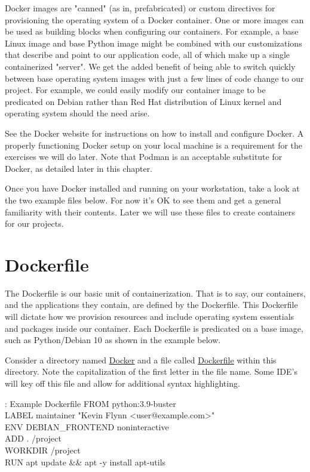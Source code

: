 \justify
Docker images are "canned" (as in, prefabricated) or custom directives
for provisioning the operating system of a Docker container. One or more
images can be used as building blocks when configuring our containers.
For example, a base Linux image and base Python image might be combined
with our customizations that describe and point to our application code,
all of which make up a single containerized "server". We get the added
benefit of being able to switch quickly between base operating system
images with just a few lines of code change to our project. For example,
we could easily modify our container image to be predicated on Debian
rather than Red Hat distribution of Linux kernel and operating system
should the need arise.

\justify
See the Docker website for instructions on how to install and configure
Docker. A properly
functioning Docker setup on your local machine is a requirement for the
exercises we will do later. Note that Podman is an acceptable substitute
for Docker, as detailed later in this chapter.

\justify
Once you have Docker installed and running on your workstation, take a
look at the two example files below. For now it's OK to see them and get
a general familiarity with their contents. Later we will use these files
to create containers for our projects.

\section{Dockerfile}
\justify
The Dockerfile is our basic unit of containerization. That is to say,
our containers, and the applications they contain, are defined by the
Dockerfile. This Dockerfile will dictate how we provision resources and
include operating system essentials and packages inside our container.
Each Dockerfile is predicated on a base image, such as Python/Debian 10
as shown in the example below.

\justify
Consider a directory named
\href{https://github.com/hotpeppersec/rapid_secdev_framework/tree/master/docker}{Docker}
and a file called
\href{https://github.com/hotpeppersec/rapid_secdev_framework/blob/master/docker/Dockerfile}{Dockerfile}
within this directory. Note the capitalization of the first letter in the file name. Some IDE's will key off this file and allow for additional syntax highlighting.

\begin{mybox}{\thetcbcounter: Example Dockerfile}
FROM python:3.9-buster\\
LABEL maintainer "Kevin Flynn <user@example.com>"\\

ENV DEBIAN\_FRONTEND noninteractive\\

ADD . /project\\
WORKDIR /project\\

RUN apt update \&\& apt -y install apt-utils\\
\end{mybox}

